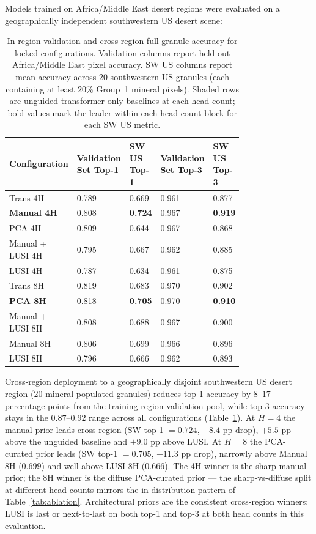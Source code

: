 \documentclass[11pt]{report}
\begin{document}
Models trained on Africa/Middle East desert regions were evaluated on a geographically independent southwestern US desert scene:

\begin{table}[htbp]
\centering
\small
\caption{In-region validation and cross-region full-granule accuracy for locked configurations.
Validation columns report held-out Africa/Middle East pixel accuracy.
SW US columns report mean accuracy across 20 southwestern US granules (each containing at least $20\%$ Group~1 mineral pixels).
Shaded rows are unguided transformer-only baselines at each head count; bold values mark the leader within each head-count block for each SW US metric.}
\label{tab:crossscene}
\begin{tabular}{p{0.2\linewidth}p{0.13\linewidth}p{0.15\linewidth}p{0.13\linewidth}p{0.15\linewidth}}
\hline
\rowcolor[gray]{0.85}
\textbf{Configuration} & \textbf{Validation Set Top-1} & \textbf{SW US Top-1} & \textbf{Validation Set Top-3} & \textbf{SW US Top-3} \\
\hline
\rowcolor{pink!30}
Trans 4H & 0.789 & 0.669 & 0.961 & 0.877 \\
\hline
\textbf{Manual 4H} & 0.808 & \textbf{0.724} & 0.967 & \textbf{0.919} \\
\hline
PCA 4H & 0.809 & 0.644 & 0.967 & 0.868 \\
\hline
Manual + LUSI 4H & 0.795 & 0.667 & 0.962 & 0.885 \\
\hline
LUSI 4H & 0.787 & 0.634 & 0.961 & 0.875 \\
\hline
\rowcolor{pink!30}
Trans 8H & 0.819 & 0.683 & 0.970 & 0.902 \\
\hline
\textbf{PCA 8H} & 0.818 & \textbf{0.705} & 0.970 & \textbf{0.910} \\
\hline
Manual + LUSI 8H & 0.808 & 0.688 & 0.967 & 0.900 \\
\hline
Manual 8H & 0.806 & 0.699 & 0.966 & 0.896 \\
\hline
LUSI 8H & 0.796 & 0.666 & 0.962 & 0.893 \\
\hline
\end{tabular}
\end{table}

Cross-region deployment to a geographically disjoint southwestern US desert region (20 mineral-populated granules) reduces top-1 accuracy by $8$--$17$ percentage points from the training-region validation pool, while top-3 accuracy stays in the $0.87$--$0.92$ range across all configurations (Table~\ref{tab:crossscene}). At $H = 4$ the manual prior leads cross-region (SW top-1 $= 0.724$, $-8.4$ pp drop), $+5.5$ pp above the unguided baseline and $+9.0$ pp above LUSI. At $H = 8$ the PCA-curated prior leads (SW top-1 $= 0.705$, $-11.3$ pp drop), narrowly above Manual 8H ($0.699$) and well above LUSI 8H ($0.666$). The 4H winner is the sharp manual prior; the 8H winner is the diffuse PCA-curated prior --- the sharp-vs-diffuse split at different head counts mirrors the in-distribution pattern of Table~\ref{tab:ablation}. Architectural priors are the consistent cross-region winners; LUSI is last or next-to-last on both top-1 and top-3 at both head counts in this evaluation.
\end{document}

